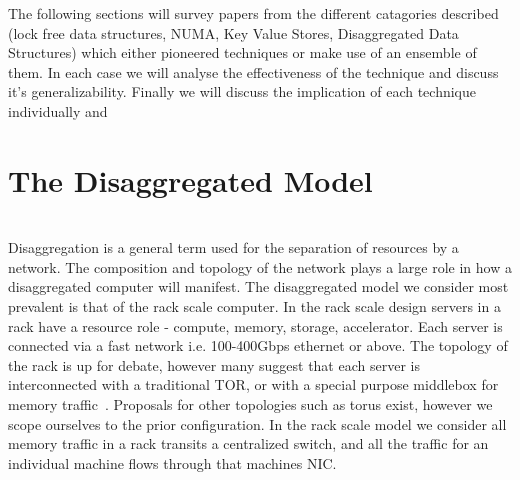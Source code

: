 The following sections will survey papers from the different catagories
described (lock free data structures, NUMA, Key Value Stores, Disaggregated Data
Structures) which either pioneered techniques or make use of an ensemble of
them. In each case we will analyse the effectiveness of the technique and
discuss it's generalizability. Finally we will discuss the implication of each
technique individually and ~



\section{The Disaggregated Model}

\\
Disaggregation is a general term used for the separation
of resources by a network. The composition and topology of the network plays a
large role in how a disaggregated computer will manifest. The disaggregated
model we consider most prevalent is that of the rack scale computer. In the rack
scale design servers in a rack have a resource role - compute, memory, storage,
accelerator. Each server is connected via a fast network i.e. 100-400Gbps
ethernet or above. The topology of the rack is up for debate, however many
suggest that each server is interconnected with a traditional TOR, or with a
special purpose middlebox for memory traffic~\cite{disandapp}. Proposals for
other topologies such as torus exist, however we scope ourselves to the prior
configuration. In the rack scale model we consider all memory traffic in a rack
transits a centralized switch, and all the traffic for an individual machine
flows through that machines NIC.


